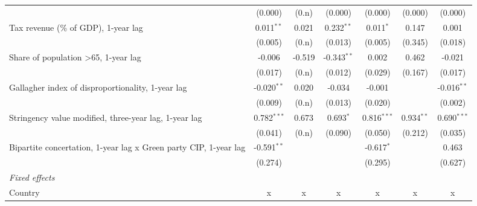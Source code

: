\begin{table}[htbp]
\begin{tabular}{lcccccc}
                                                                       & (0.000)       & (0.n)                     & (0.000)        & (0.000)         & (0.000)         & (0.000)\\   
      Tax revenue (\% of GDP), 1-year lag                              & 0.011$^{**}$  & 0.021                     & 0.232$^{**}$   & 0.011$^{*}$     & 0.147           & 0.001\\   
                                                                       & (0.005)       & (0.n)                     & (0.013)        & (0.005)         & (0.345)         & (0.018)\\   
      Share of population >65, 1-year lag                              & -0.006        & -0.519                    & -0.343$^{**}$  & 0.002           & 0.462           & -0.021\\   
                                                                       & (0.017)       & (0.n)                     & (0.012)        & (0.029)         & (0.167)         & (0.017)\\   
      Gallagher index of disproportionality, 1-year lag                & -0.020$^{**}$ & 0.020                     & -0.034         & -0.001          &                 & -0.016$^{**}$\\   
                                                                       & (0.009)       & (0.n)                     & (0.013)        & (0.020)         &                 & (0.002)\\   
      Stringency value modified, three-year lag, 1-year lag            & 0.782$^{***}$ & 0.673                     & 0.693$^{*}$    & 0.816$^{***}$   & 0.934$^{**}$    & 0.690$^{***}$\\   
                                                                       & (0.041)       & (0.n)                     & (0.090)        & (0.050)         & (0.212)         & (0.035)\\   
      Bipartite concertation, 1-year lag x Green party CIP, 1-year lag & -0.591$^{**}$ &                           &                & -0.617$^{*}$    &                 & 0.463\\   
                                                                       & (0.274)       &                           &                & (0.295)         &                 & (0.627)\\   
      \emph{Fixed effects}\\
      Country                                                          & x             & x                         & x              & x               & x               & x\\  

\end{tabular}
\end{table}
